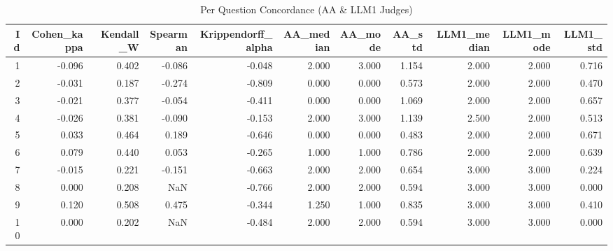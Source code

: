 \begin{table}
\caption{Per Question Concordance (AA & LLM1 Judges)}
\label{tab:per_question_concordance_AA_LLM1}
\begin{tabular}{rrrrrrrrrrr}
\toprule
Id & Cohen_kappa & Kendall_W & Spearman & Krippendorff_alpha & AA_median & AA_mode & AA_std & LLM1_median & LLM1_mode & LLM1_std \\
\midrule
1 & -0.096 & 0.402 & -0.086 & -0.048 & 2.000 & 3.000 & 1.154 & 2.000 & 2.000 & 0.716 \\
2 & -0.031 & 0.187 & -0.274 & -0.809 & 0.000 & 0.000 & 0.573 & 2.000 & 2.000 & 0.470 \\
3 & -0.021 & 0.377 & -0.054 & -0.411 & 0.000 & 0.000 & 1.069 & 2.000 & 2.000 & 0.657 \\
4 & -0.026 & 0.381 & -0.090 & -0.153 & 2.000 & 3.000 & 1.139 & 2.500 & 2.000 & 0.513 \\
5 & 0.033 & 0.464 & 0.189 & -0.646 & 0.000 & 0.000 & 0.483 & 2.000 & 2.000 & 0.671 \\
6 & 0.079 & 0.440 & 0.053 & -0.265 & 1.000 & 1.000 & 0.786 & 2.000 & 2.000 & 0.639 \\
7 & -0.015 & 0.221 & -0.151 & -0.663 & 2.000 & 2.000 & 0.654 & 3.000 & 3.000 & 0.224 \\
8 & 0.000 & 0.208 & NaN & -0.766 & 2.000 & 2.000 & 0.594 & 3.000 & 3.000 & 0.000 \\
9 & 0.120 & 0.508 & 0.475 & -0.344 & 1.250 & 1.000 & 0.835 & 3.000 & 3.000 & 0.410 \\
10 & 0.000 & 0.202 & NaN & -0.484 & 2.000 & 2.000 & 0.594 & 3.000 & 3.000 & 0.000 \\
\bottomrule
\end{tabular}
\end{table}
